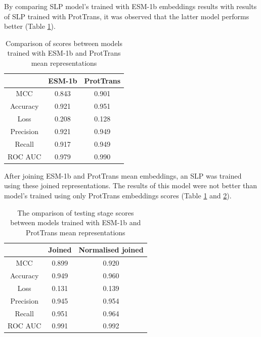 \documentclass[12pt]{article}
\begin{document}
	By comparing SLP model's trained with ESM-1b embeddings results
	with results of SLP trained with ProtTrans, it was observed that 
	the latter model performs better (Table \ref{table:comparisonESMandPT}).

	\begin{table}[h!]
		\caption{Comparison of scores between models trained with ESM-1b
		and ProtTrans mean representations}
		\vspace{0.2cm}
		\centering
		\begin{tabular}{ | c | c c | }
			\hline 
						
			& ESM-1b & ProtTrans \\
			\hline 
			MCC & 0.843 & 0.901 \\
			Accuracy & 0.921 & 0.951 \\
			Loss & 0.208 & 0.128 \\
			Precision & 0.921 & 0.949 \\
			Recall & 0.917 & 0.949 \\
			ROC AUC & 0.979 & 0.990 \\
			\hline    
		\end{tabular}
		\label{table:comparisonESMandPT}
	\end{table}

	After joining ESM-1b and ProtTrans mean embeddings, an SLP was trained 
	using these joined representations. The results of this model were not 
	better than model's trained using only ProtTrans embeddings scores
	(Table \ref{table:comparisonESMandPT} and 
	\ref{table:comparisonJoinedAndJoinedNorm}). 

	\begin{table}[h!]
		\caption{The omparison of testing stage scores between 
		models trained with ESM-1b and ProtTrans mean 
		representations}
		\vspace{0.2cm}
		\centering
		\begin{tabular}{ | c | c c | }
			\hline 
						
			& Joined & Normalised joined \\
			\hline 
			MCC & 0.899 & 0.920 \\
			Accuracy & 0.949 & 0.960 \\
			Loss & 0.131 & 0.139 \\
			Precision & 0.945 & 0.954 \\
			Recall & 0.951 & 0.964 \\
			ROC AUC & 0.991 & 0.992 \\
			\hline    
		\end{tabular}
		\label{table:comparisonJoinedAndJoinedNorm}
	\end{table}
\end{document}
